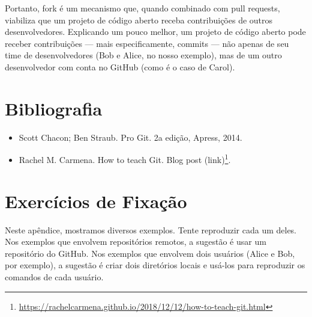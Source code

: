 \documentclass[
  11pt,
  twoside]{book}
\DeclareRobustCommand{\href}[2]{#2\footnote{\url{#1}}}
\begin{document}
Portanto, fork é um mecanismo que, quando combinado com pull requests,
viabiliza que um projeto de código aberto receba contribuições de outros
desenvolvedores. Explicando um pouco melhor, um projeto de código aberto
pode receber contribuições --- mais especificamente, commits --- não
apenas de seu time de desenvolvedores (Bob e Alice, no nosso exemplo),
mas de um outro desenvolvedor com conta no GitHub (como é o caso de
Carol).

\hypertarget{bibliografia-10}{%
\section*{Bibliografia}\label{bibliografia-10}}

\begin{itemize}
\item
  Scott Chacon; Ben Straub. Pro Git. 2a edição, Apress, 2014.
\item
  Rachel M. Carmena. How to teach Git. Blog post
  \href{https://rachelcarmena.github.io/2018/12/12/how-to-teach-git.html}{(link)}.
\end{itemize}

\hypertarget{exercuxedcios-de-fixauxe7uxe3o-10}{%
\section*{Exercícios de
Fixação}\label{exercuxedcios-de-fixauxe7uxe3o-10}}

Neste apêndice, mostramos diversos exemplos. Tente reproduzir cada um
deles. Nos exemplos que envolvem repositórios remotos, a sugestão é usar
um repositório do GitHub. Nos exemplos que envolvem dois usuários (Alice
e Bob, por exemplo), a sugestão é criar dois diretórios locais e usá-los
para reproduzir os comandos de cada usuário.

\printindex

\backmatter
\end{document}
